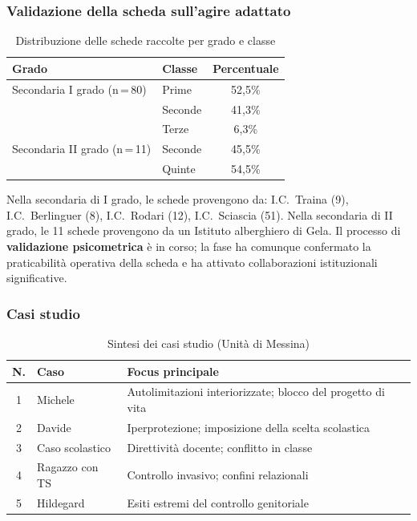 \documentclass[12pt,a4paper]{article}
\begin{document}
\subsubsection{Validazione della scheda sull'agire adattato}

\begin{table}[h]
\centering
\caption{Distribuzione delle schede raccolte per grado e classe}
\label{tab:messina_schede}
\begin{tabular}{llc}
\toprule
\textbf{Grado} & \textbf{Classe} & \textbf{Percentuale} \\
\midrule
Secondaria I grado (n\,=\,80) & Prime & 52,5\% \\
 & Seconde & 41,3\% \\
 & Terze & 6,3\% \\
\midrule
Secondaria II grado (n\,=\,11) & Seconde & 45,5\% \\
 & Quinte & 54,5\% \\
\bottomrule
\end{tabular}
\end{table}

Nella secondaria di I grado, le schede provengono da: I.C.\ Traina (9), I.C.\ Berlinguer (8), I.C.\ Rodari (12), I.C.\ Sciascia (51). Nella secondaria di II grado, le 11 schede provengono da un Istituto alberghiero di Gela. Il processo di \textbf{validazione psicometrica} \`e in corso; la fase ha comunque confermato la praticabilit\`a operativa della scheda e ha attivato collaborazioni istituzionali significative.

\subsubsection{Casi studio}

\begin{table}[h]
\centering
\caption{Sintesi dei casi studio (Unit\`a di Messina)}
\label{tab:messina_casi}
\small
\begin{tabularx}{\textwidth}{clX}
\toprule
\textbf{N.} & \textbf{Caso} & \textbf{Focus principale} \\
\midrule
1 & Michele & Autolimitazioni interiorizzate; blocco del progetto di vita \\
2 & Davide & Iperprotezione; imposizione della scelta scolastica \\
3 & Caso scolastico & Direttivit\`a docente; conflitto in classe \\
4 & Ragazzo con TS & Controllo invasivo; confini relazionali \\
5 & Hildegard & Esiti estremi del controllo genitoriale \\
\bottomrule
\end{tabularx}
\end{table}
\end{document}
